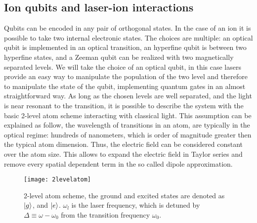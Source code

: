 \subsection{Ion qubits and laser-ion interactions}
Qubits can be encoded in any pair of orthogonal states. In the case of an ion it is possible to take two internal electronic states. The choices are multiple: an optical qubit is implemented in an optical transition, an hyperfine qubit is between two hyperfine states, and a Zeeman qubit can be realized with two magnetically separated levels. We will take the choice of an optical qubit, in this case lasers provide an easy way to manipulate the population of the two level and therefore to manipulate the state of the qubit, implementing quantum gates in an almost straightforward way. As long as the chosen levels are well separated, and the light is near resonant to the transition, it is possible to describe the system with the basic 2-level atom scheme interacting with classical light. This assumption can be explained as follow, the wavelength of transitions in an atom, are typically in the optical regime: hundreds of nanometers, which is order of magnitude greater then the typical atom dimension. Thus, the electric field can be considered constant over the atom size. This allows to expand the electric field in Taylor series and remove every spatial dependent term in the so called dipole approximation.
\begin{figure}[H]
\centering
\texttt{[image: 2levelatom]}
\caption{2-level atom scheme, the ground and excited states are denoted as $\ket{g}$, and $\ket{e}$. $\omega_l$ is the laser frequency, which is detuned by $\Delta \equiv \omega - \omega_0$ from the transition frequency $\omega_0$.}
\label{2levelatom}
\end{figure}

